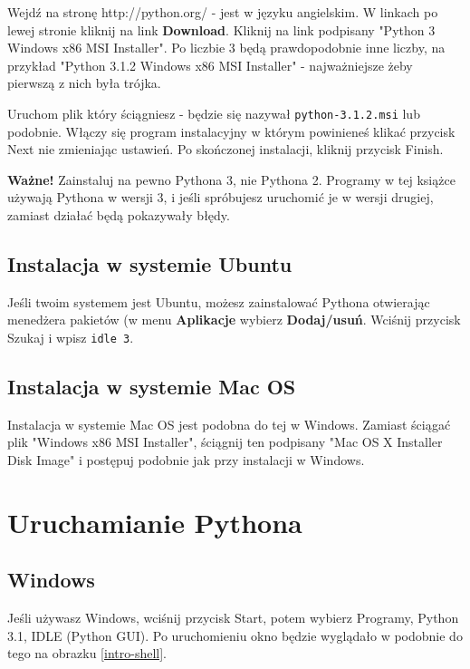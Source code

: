\documentclass{book}
\begin{document}
Wejdź na stronę http://python.org/ - jest w języku angielskim. W linkach po lewej stronie kliknij na link {\bf Download}. Kliknij na link podpisany "Python 3 Windows x86 MSI Installer". Po liczbie 3 będą prawdopodobnie inne liczby, na przykład "Python 3.1.2 Windows x86 MSI Installer" - najważniejsze żeby pierwszą z nich była trójka. 

Uruchom plik który ściągniesz - będzie się nazywał \lstinline{python-3.1.2.msi} lub podobnie. Włączy się program instalacyjny w którym powinieneś klikać przycisk Next nie zmieniając ustawień. Po skończonej instalacji, kliknij przycisk Finish.

{\bf Ważne!} Zainstaluj na pewno Pythona 3, nie Pythona 2. Programy w tej książce używają Pythona w wersji 3, i jeśli spróbujesz uruchomić je w wersji drugiej, zamiast działać będą pokazywały błędy.

\subsection{Instalacja w systemie Ubuntu}

Jeśli twoim systemem jest Ubuntu, możesz zainstalować Pythona otwierając menedżera pakietów (w menu {\bf Aplikacje} wybierz {\bf Dodaj/usuń}.  Wciśnij przycisk Szukaj i wpisz \lstinline{idle 3}. 

\subsection{Instalacja w systemie Mac OS}

Instalacja w systemie Mac OS jest podobna do tej w Windows. Zamiast ściągać plik "Windows x86 MSI Installer", ściągnij ten podpisany "Mac OS X Installer Disk Image" i postępuj podobnie jak przy instalacji w Windows.


\section{Uruchamianie Pythona}

\subsection{Windows}

Jeśli używasz Windows, wciśnij przycisk Start, potem wybierz Programy, Python 3.1, IDLE (Python GUI). Po uruchomieniu okno będzie wyglądało w podobnie do tego na obrazku \ref{intro-shell}.
\end{document}
